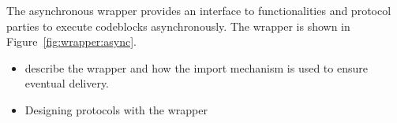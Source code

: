 The asynchronous wrapper provides an interface to functionalities and protocol parties to execute codeblocks asynchronously.
The wrapper is shown in Figure~\ref{fig:wrapper:async}.

\begin{itemize}
\item describe the wrapper and how the import mechanism is used to ensure eventual delivery.
\item Designing protocols with the wrapper
\end{itemize}
